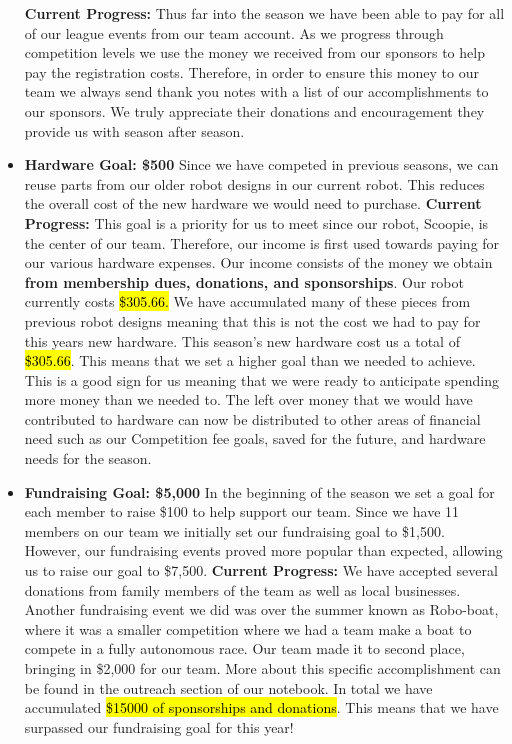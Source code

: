 \begin{itemize}
  \textbf{Current Progress: }
 	Thus far into the season we have been able to pay for all of our league events from our team account. As we progress through competition levels we use the money we received from our sponsors to help pay the registration costs. Therefore, in order to ensure this money to our team we always send thank you notes with a list of our accomplishments to our sponsors. We truly appreciate their donations and encouragement they provide us with season after season. 
  \item \textbf{\Large Hardware Goal: \$500 }
  \newline 
  Since we have competed in previous seasons, we can reuse parts from our older robot designs in our current robot. This reduces the overall cost of the new hardware we would need to purchase. 
  \newline
  \textbf{Current Progress: }
  This goal is a priority for us to meet since our robot, Scoopie, is the center of our team. Therefore, our income is first used towards paying for our various hardware expenses. Our income consists of the money we obtain \textbf{from membership dues, donations, and sponsorships}. Our robot currently costs \hl{\$305.66.} We have accumulated many of these pieces from previous robot designs meaning that this is not the cost we had to pay for this years new hardware. This season's new hardware cost us a total of \hl{\$305.66}. This means that we set a higher goal than we needed to achieve. This is a good sign for us meaning that we were ready to anticipate spending more money than we needed to. The left over money that we would have contributed to hardware can now be distributed to other areas of financial need such as our Competition fee goals, saved for the future, and hardware needs for the season.
  \item \textbf{\Large Fundraising Goal: \$5,000 }
  \newline 
In the beginning of the season we set a goal for each member to raise \$100 to help support our team. Since we have 11 members on our team we initially set our fundraising goal to \$1,500. However, our fundraising events proved more popular than expected, allowing us to raise our goal to \$7,500.
  \newline 
  \textbf{Current Progress: }We have accepted several donations from family members of the team as well as local businesses. Another fundraising event we did was over the summer known as Robo-boat, where it was a smaller competition where we had a team make a boat to compete in a fully autonomous race. Our team made it to second place, bringing in \$2,000 for our team. More about this specific accomplishment can be found in the outreach section of our notebook. In total we have accumulated \hl{\$15000 of sponsorships and donations}. This means that we have surpassed our fundraising goal for this year!
  
\end{itemize}

